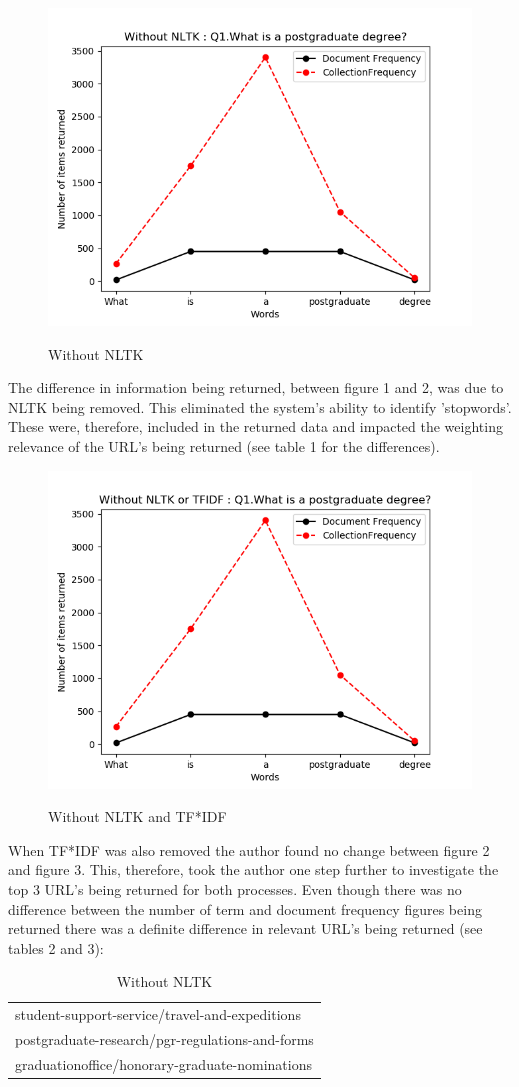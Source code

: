 \documentclass{sig-alternate}
\begin{document}
{\begin{figure}[H]
	\centering
	\caption{Without NLTK}\label{fig:dist}
	\includegraphics[width=0.4 \textwidth, height=0.16 \textheight] {Q1_NoNLTK.PNG}\\
\end{figure}

The difference in information being returned, between figure 1 and 2, was due to NLTK being removed. This eliminated the system's ability to identify 'stopwords'. These were, therefore, included in the returned data and impacted the weighting relevance of the URL's being returned (see table 1 for the differences).

\begin{figure}[H]
	\centering
	\caption{Without NLTK and TF*IDF}\label{fig:dist}
	\includegraphics[width=0.4 \textwidth, height=.16 \textheight] {Q1_nothing.PNG}\\
\end{figure}

When TF*IDF was also removed the author found no change between figure 2 and figure 3. This, therefore, took the author one step further to investigate the top 3 URL's being returned for both processes. Even though there was no difference between the number of term and document frequency figures being returned there was a definite difference in relevant URL's being returned (see tables 2 and 3): 

\begin{table} [h]
	\centering 
	\caption{Without NLTK}\label{textresult}
	\begin{tabular}{|l|} \hline
		student-support-service/travel-and-expeditions \\
		postgraduate-research/pgr-regulations-and-forms  \\
		graduationoffice/honorary-graduate-nominations \\
		\hline
	\end{tabular}
\end{table}

}
\end{document}
